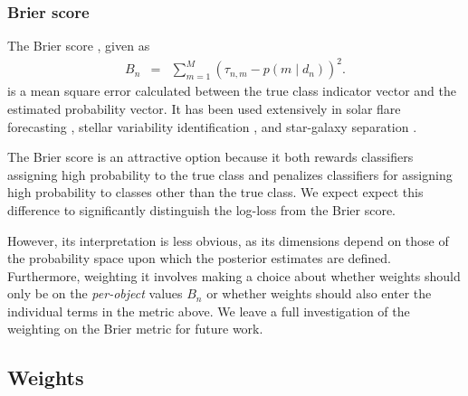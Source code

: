 \subsubsection{Brier score}
\label{sec:brier}

The Brier score \cite{brier_verification_1950}, given as
\begin{eqnarray}
  \label{eq:brier}
B_{n} &=& \sum_{m=1}^{M}(\tau_{n, m}-p(m \mid d_{n}))^{2}.
\end{eqnarray}
is a mean square error calculated between the true class indicator vector and the estimated probability vector.
It has been used extensively in solar flare forecasting \cite{crown_validation, mays_ensemble_2015, florios_forecasting_2018}, stellar variability identification \citep{richards_construction_2012, armstrong_k2_2016}, and star-galaxy separation \citep{kim_hybrid_2015}.

The Brier score is an attractive option because it both rewards classifiers assigning high probability to the true class and penalizes classifiers for assigning high probability to classes other than the true class.
We expect expect this difference to significantly distinguish the log-loss from the Brier score.

However, its interpretation is less obvious, as its dimensions depend on those of the probability space upon which the posterior estimates are defined.
Furthermore, weighting it involves making a choice about whether weights should only be on the \textit{per-object} values $B_{n}$ or whether weights should also enter the individual terms in the metric above. We leave a full investigation of the weighting on the Brier metric for future work.



%

\subsection{Weights}
\label{sec:weights}

